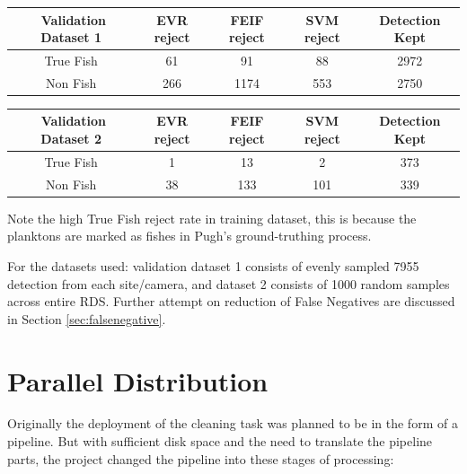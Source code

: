 \documentclass[bsc,logo,twoside,fullspacing,parskip]{infthesis}
\begin{document}
\begin{center}
\begin{tabular}{|c|c|c|c|c|}
\hline 
$ $ Validation Dataset 1 & EVR reject & FEIF reject & SVM reject & Detection Kept\\
\hline 
True Fish & 61 & 91 & 88 & 2972 \\
Non Fish & 266 & 1174  & 553 & 2750 \\
\hline 
\end{tabular}
\end{center}

\begin{center}
\begin{tabular}{|c|c|c|c|c|}
\hline 
$ $ Validation Dataset 2 & EVR reject & FEIF reject & SVM reject & Detection Kept\\
\hline 
True Fish & 1 & 13  & 2 & 373 \\
Non Fish & 38 & 133 & 101 & 339 \\
\hline 
\end{tabular}
\end{center}

Note the high True Fish reject rate in training dataset, this is because the planktons are marked as fishes in Pugh's ground-truthing process. 

For the datasets used: validation dataset 1 consists of evenly sampled 7955 detection from each site/camera, and dataset 2 consists of 1000 random samples across entire RDS.
Further attempt on reduction of False Negatives are discussed in Section \ref{sec:falsenegative}.




\chapter{Parallel Distribution}
\label{chap:parallel}

Originally the deployment of the cleaning task was planned to be in the form of a pipeline.
But with sufficient disk space and the need to translate the pipeline parts, the project changed the pipeline into these stages of processing:
\end{document}
